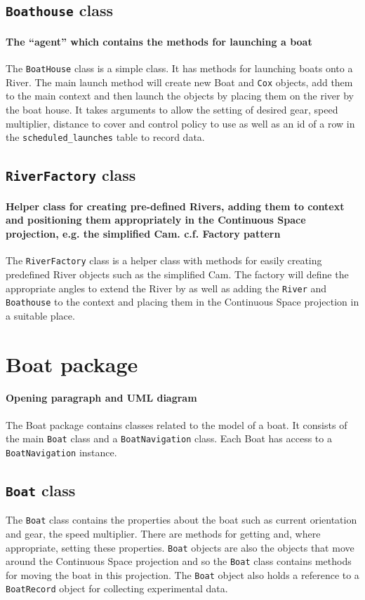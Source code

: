 \subsection{\texttt{Boathouse} class}
\paragraph{The ``agent'' which contains the methods for launching a boat}
The \texttt{BoatHouse} class is a simple class. It has methods for launching
boats onto a River. The main launch method will create new Boat and
\texttt{Cox} objects, add them to the main context and then launch the objects
by placing them on the river by the boat house. It takes arguments to
allow the setting of desired gear, speed multiplier, distance to
cover and control policy to use as well as an id of a row in the
\texttt{scheduled\_launches} table to record data.

\subsection{\texttt{RiverFactory} class}
\paragraph{Helper class for creating pre-defined Rivers, adding them
  to context and positioning them appropriately in the Continuous
  Space projection, e.g. the simplified Cam. c.f. Factory pattern}
The \texttt{RiverFactory} class is a helper class with methods for easily creating
predefined River objects such as the simplified Cam. The factory will
define the appropriate angles to extend the River by as well as adding
the \texttt{River} and \texttt{Boathouse} to the context and placing them in the
Continuous Space projection in a suitable place.

\section{Boat package}
\paragraph{Opening paragraph and UML diagram}
The Boat package contains classes related to the model of a boat. It
consists of the main \texttt{Boat} class and a \texttt{BoatNavigation} class. Each Boat
has access to a \texttt{BoatNavigation} instance.

\subsection{\texttt{Boat} class}
The \texttt{Boat} class contains the properties about the boat such as current
orientation and gear, the speed multiplier. There are methods for
getting and, where appropriate, setting these properties. \texttt{Boat} objects are also the
objects that move around the Continuous Space projection and so the
\texttt{Boat} class contains methods for moving the boat in this
projection. The \texttt{Boat} object also holds a reference to a \texttt{BoatRecord}
object for collecting experimental data.

